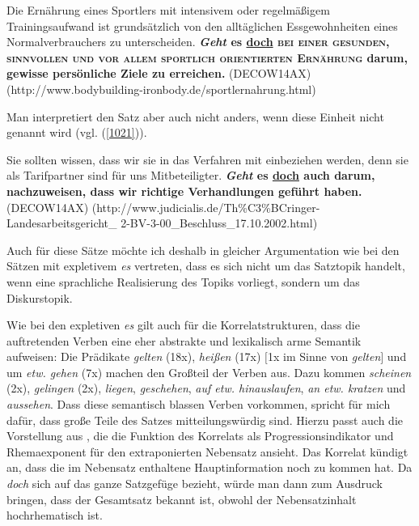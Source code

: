 {\begin{exe}
	\ex\label{1020} 
	\scriptsize
	Die Ernährung eines Sportlers mit intensivem oder regelmäßigem Trainingsaufwand ist grundsätzlich von den alltäglichen Essgewohnheiten eines 				Normalverbrauchers zu unterscheiden. \textbf{\textit{Geht} es \underline{doch} \textsc{bei einer gesunden, sinnvollen und vor allem sportlich 				orientierten Ernährung} darum, gewisse persönliche Ziele zu erreichen.}	
	\hfill\hbox {(DECOW14AX)}
	\newline
	\hbox{}\hfill\hbox{(http://www.bodybuilding-ironbody.de/sportlernahrung.html)}	
\end{exe}
Man interpretiert den Satz aber auch nicht anders, wenn diese Einheit nicht genannt wird (vgl. (\ref{1021})).

\begin{exe}
	\ex\label{1021} 
	\scriptsize
	Sie sollten wissen, dass wir sie in das Verfahren mit einbeziehen werden, denn sie als Tarifpartner sind für uns Mitbeteiligter. \textbf{\textit{Geht} 		es \underline{doch} auch darum, nachzuweisen, dass wir richtige Verhandlungen geführt haben.}
	\hfill\hbox {(DECOW14AX)}
	\newline
	\hbox{}\hfill\hbox{(http://www.judicialis.de/Th\%C3\%BCringer-Landesarbeitsgericht\_}
	\newline
	\hbox{}\hfill\hbox{2-BV-3-00\_Beschluss\_17.10.2002.html)}
\end{exe}
Auch für diese Sätze möchte ich deshalb in gleicher Argumentation wie bei den Sätzen mit expletivem \textit{es} vertreten, dass es sich nicht um das Satztopik  handelt, wenn eine sprachliche Realisierung des \glq Topiks\grq {} vorliegt, sondern um das Diskurstopik.

Wie bei den expletiven \textit{es} gilt auch für die Korrelatstrukturen, dass die auftretenden Verben eine eher abstrakte und lexikalisch arme Semantik aufweisen: Die Prädikate \textit{gelten} (18x), \textit{heißen} (17x) $[$1x im Sinne von \textit{gelten}$]$ und um \textit{etw. gehen} (7x) machen den Großteil der Verben aus. Dazu kommen \textit{scheinen} (2x), \textit{gelingen} (2x), \textit{liegen}, \textit{geschehen}, \textit{auf etw. hinauslaufen}, \textit{an etw. kratzen} und \textit{aussehen}. Dass diese semantisch blassen Verben vorkommen, spricht für mich dafür, dass große Teile des Satzes mitteilungswürdig sind. Hierzu passt auch die Vorstellung aus \citet[153]{Zitterbart2002}, die die Funktion des Korrelats als \glqq Progressionsindikator\grqq{} und \glqq Rhemaexponent für den extraponierten Nebensatz\grqq{} ansieht. Das Korrelat \glqq kündigt an, dass die im Nebensatz enthaltene Hauptinformation noch zu kommen hat\grqq{}. Da \textit{doch} sich auf das ganze Satzgefüge bezieht, würde man dann zum Ausdruck bringen, dass der Gesamtsatz bekannt ist, obwohl der Nebensatzinhalt hochrhematisch  ist.

}
